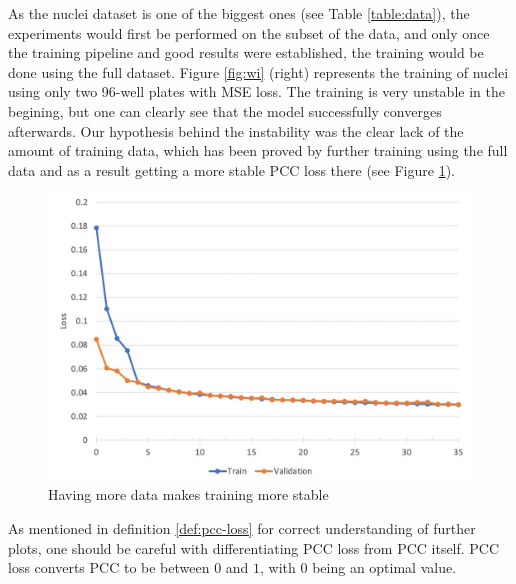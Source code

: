 

As the nuclei dataset is one of the biggest ones (see Table \ref{table:data}), the experiments would first be performed on the subset of the data, and only once the training pipeline and good results were established, the training would be done using the full dataset. Figure \ref{fig:wi} (right) represents the training of nuclei using only two 96-well plates with MSE loss. The training is very unstable in the begining, but one can clearly see that the model successfully converges afterwards. Our hypothesis behind the instability was the clear lack of the amount of training data, which has been proved by further training using the full data and as a result getting a more stable PCC loss there (see Figure \ref{fig:full-dataset-pcc}).

\begin{figure}[H]
	\begin{center}
		\includegraphics[width=0.5\linewidth]{bilder/nuclei/full-dataset.jpg}
		\caption{Having more data makes training more stable}\label{fig:full-dataset-pcc}
	\end{center}
\end{figure}

As mentioned in definition \ref{def:pcc-loss} for correct understanding of further plots, one should be careful with differentiating PCC loss from PCC itself. PCC loss converts PCC to be between $0$ and $1$, with $0$ being an optimal value.

